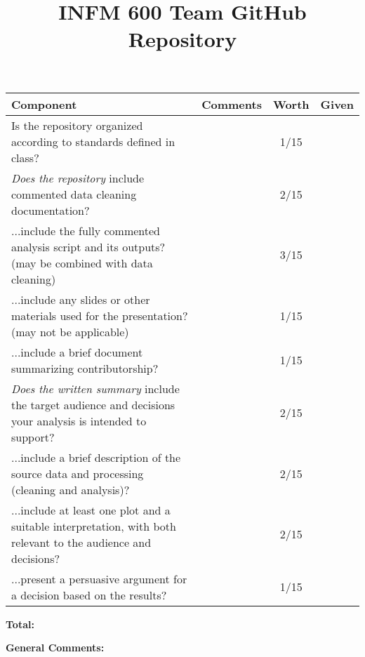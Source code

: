 \documentclass[12pt]{article}
\title{INFM 600 Team GitHub Repository}
\date{\vspace{-10ex}}%
\newcommand\tab[1][0.25cm]{\hspace*{#1}}
\begin{document}
	\maketitle
		\renewcommand{\arraystretch}{2}
		\begin{tabulary}{6.5in}{| p{2.75in} | p{2.5in} | c | c |}
			\hline
			\textbf{Component} & \textbf{Comments} & \textbf{Worth} & \textbf{Given}\\
			\hline
			Is the repository organized according to standards defined in class?  & &  1/15 & \\
			\hline
			\textit{Does the repository} include commented data cleaning documentation? & & 2/15 &\\
			\hline
			...include the fully commented analysis script and its outputs? (may be combined with data cleaning) & &  3/15 & \\
			\hline
			...include any slides or other materials used for the presentation? (may not be applicable) & &  1/15 & \\
			\hline
			...include a brief document summarizing contributorship? & & 1/15 & \\
			\hline
			\textit{Does the written summary} include the target audience and decisions your analysis is intended to support? & & 2/15 & \\
			\hline
			...include a brief description of the source data and processing (cleaning and analysis)? & & 2/15 & \\
			\hline
			...include at least one plot and a suitable interpretation, with both relevant to the audience and decisions? & & 2/15 & \\
			\hline
			...present a persuasive argument for a decision based on the results? & & 1/15 & \\
			\hline
		\end{tabulary}

\begin{flushright}
	\textbf{Total:}\tab[3.3cm]
\end{flushright}


	\textbf{General Comments:}

	
\end{document}
